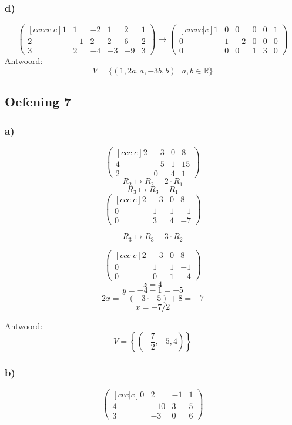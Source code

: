 \documentclass[lineaire_algebra_oplossingen.tex]{subfiles}
\begin{document}
\subsubsection*{d)}
\[
\begin{pmatrix}[ccccc|c]
1 &  1 & -2 &  1 &  2 & 1\\
2 & -1 &  2 &  2 &  6 & 2\\
3 &  2 & -4 & -3 & -9 & 3
\end{pmatrix}
\longrightarrow
\begin{pmatrix}[ccccc|c]
1 &  0 &  0 &  0 &  0 & 1\\
0 &  1 & -2 &  0 &  0 & 0\\
0 &  0 &  0 &  1 &  3 & 0
\end{pmatrix}
\]
Antwoord:
\[
V=\{(1,2a,a,-3b,b)\ |\ a,b \in \mathbb{R} \}
\]

\subsection{Oefening 7}
\subsubsection*{a)}
\[
\begin{pmatrix}[ccc|c]
2 & -3 & 0 & 8\\
4 & -5 & 1 & 15\\
2 & 0 & 4 & 1
\end{pmatrix}
\]
\[ R_2 \longmapsto R_2 - 2\cdot R_1\]
\[ R_3 \longmapsto R_3 -  R_1\]
\[
\begin{pmatrix}[ccc|c]
2 & -3 & 0 & 8\\
0 & 1 & 1 & -1\\
0 & 3 & 4 & -7
\end{pmatrix}
\]

\[ R_3 \longmapsto R_3 - 3\cdot R_2\]

\[
\begin{pmatrix}[ccc|c]
2 & -3 & 0 & 8\\
0 & 1 & 1 & -1\\
0 & 0 & 1 & -4
\end{pmatrix}
\]
\[
z = 4\]
\[y = -4-1 = -5\]
\[2x = -(-3\cdot -5) + 8=-7\]
\[ x = -7/2\]

Antwoord:
\[
V = \left\{\left( -\frac{7}{2},-5,4 \right)\right\}
\]

\subsubsection*{b)}
\[
\begin{pmatrix}[ccc|c]
0 & 2 & -1 & 1\\
4 & -10 & 3 & 5\\
3 & -3 & 0 & 6
\end{pmatrix}
\]
\end{document}
